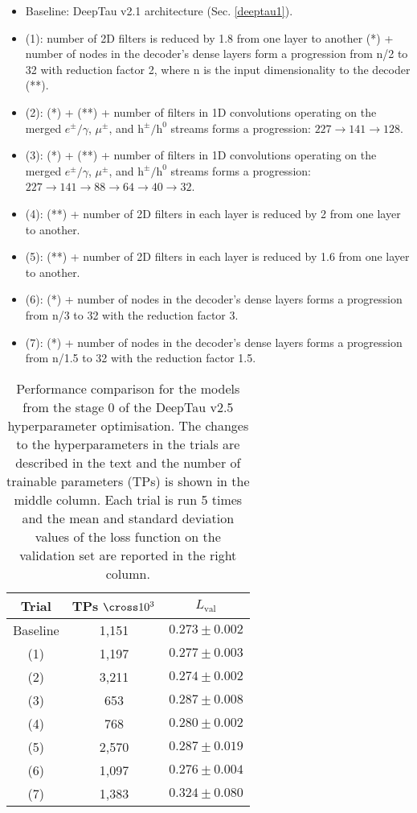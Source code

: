 \begin{itemize}
    \item Baseline: DeepTau v2.1 architecture (Sec. \ref{deeptau1}).
    \item (1): number of 2D filters is reduced by 1.8 from one layer to another (*) + number of nodes in the decoder's dense layers form a progression from n/2 to 32 with reduction factor 2, where n is the input dimensionality to the decoder (**). 
    \item (2): (*) + (**) + number of filters in 1D convolutions operating on the merged $e^\pm/\gamma$, $\mu^\pm$, and $\mathrm{h}^\pm/\mathrm{h}^0$ streams forms a progression: $227 \to 141 \to 128$.
    \item (3): (*) + (**) + number of filters in 1D convolutions operating on the merged $e^\pm/\gamma$, $\mu^\pm$, and $\mathrm{h}^\pm/\mathrm{h}^0$ streams forms a progression: $227 \to 141 \to 88 \to 64 \to 40 \to 32$.
    \item (4): (**) + number of 2D filters in each layer is reduced by 2 from one layer to another.
    \item (5): (**) + number of 2D filters in each layer is reduced by 1.6 from one layer to another.
    \item (6): (*) + number of nodes in the decoder's dense layers forms a progression from n/3 to 32 with the reduction factor 3. 
    \item (7): (*) + number of nodes in the decoder's dense layers forms a progression from n/1.5 to 32 with the reduction factor 1.5. 
\end{itemize} 
\begin{table}[h]
	\caption{Performance comparison for the models from the stage 0 of the DeepTau v2.5 hyperparameter optimisation. The changes to the hyperparameters in the trials are described in the text and the number of trainable parameters (TPs) is shown in the middle column. Each trial is run 5 times and the mean and standard deviation values of the loss function on the validation set are reported in the right column.}
    \centering
	\begin{tabular}{c|c|c}
		Trial & TPs $\cross 10^{3}$  & $L_\text{val}$\\
		\hline
		Baseline & 1,151 & $\mathbf{0.273 \pm 0.002}$\\
        (1) & 1,197  & $0.277 \pm 0.003$\\
        (2)  & 3,211 & $0.274 \pm 0.002$ \\
        (3)  & 653 & $0.287	\pm 0.008$ \\
        (4)  & 768 & $0.280 \pm 0.002$ \\
        (5)  & 2,570 & $0.287 \pm 0.019$ \\ 
        (6)  & 1,097 & $0.276 \pm 0.004$ \\
        (7)  & 1,383 & $0.324 \pm 0.080$ \\
	\end{tabular} \label{tab:v2p5_stage0}
\end{table}

